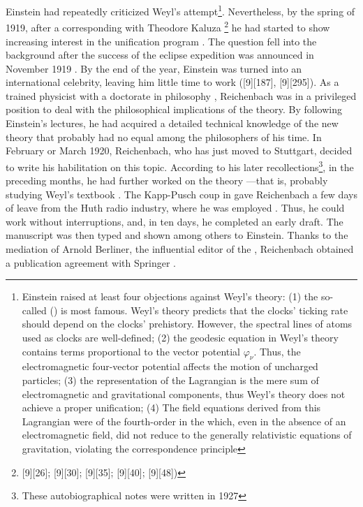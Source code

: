 \documentclass[draft]{article}
\newcommand{\phin}{\ensuremath{\varphi_\nu}\xspace}
\newcommand{\WT}{Weyl's theory\xspace}
\begin{document}
Einstein had repeatedly criticized Weyl's attempt\footnote{Einstein raised at least four objections against Weyl's theory: (1) the so-called  () \citep{Einstein1918b} is most famous. \WT predicts that the clocks' ticking rate should depend on the clocks' prehistory. However, the spectral lines of atoms used as clocks are well-defined; (2) the geodesic equation in Weyl's theory con­tains terms proportional to the vector potential \phin. Thus, the electromagnetic four-vector potential affects the motion of uncharged particles; (3) the representation of the Lagrangian is the mere sum of electromagnetic and gravitational components, thus \WT does not achieve a proper unification; (4) The field equations derived from this Lagrangian were of the fourth-order in the \gmn which, even in the absence of an electromagnetic field, did not reduce to the generally relativistic equations of gravitation, violating the correspondence principle}. Nevertheless, by the spring of 1919, after a corresponding with Theodore Kaluza \citep{Wuensch2005}\footnote{[9][26]; [9][30]; [9][35]; [9][40]; [9][48])} he had started to show increasing interest in the unification program \citep{Einstein1919a}. The question fell into the background after the success of the eclipse expedition was announced in November 1919 \citep{Dyson1920}. By the end of the year, Einstein was turned into an international celebrity, leaving him little time to work ([9][187], [9][295]). As a trained physicist with a doctorate in philosophy \citep{Reichenbach1916}, Reichenbach was in a privileged position to deal with the philosophical implications of the theory. By following Einstein's lectures, he had acquired a detailed technical knowledge of the new theory that probably had no equal among the philosophers of his time. In February or March 1920, Reichenbach, who has just moved to Stuttgart, decided to write his habilitation on this topic. According to his later recollections\footnote{These autobiographical notes \cite[044-06-23]{HR} were written in 1927}, in the preceding months, he had further worked on the theory  \citep[044-06-23]{HR}---that is, probably studying Weyl's textbook  \citep{Weyl1918}. The Kapp-Pusch coup in  gave Reichenbach a few days of leave from the Huth radio industry, where he was employed \citep[044-06-23]{HR}. Thus, he could work without interruptions, and, in ten days, he completed an early draft. The manuscript was then typed and shown among others to Einstein. Thanks to the mediation of Arnold Berliner, the influential editor of the , Reichenbach obtained a publication agreement with Springer \citep[044-06-23]{HR}.
\end{document}

